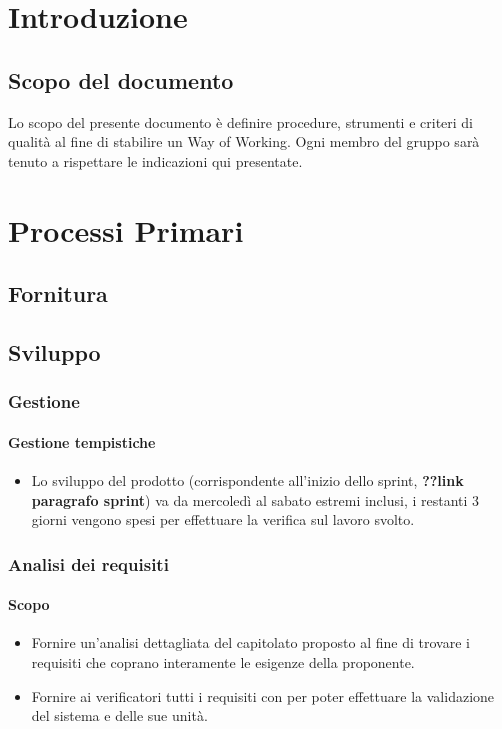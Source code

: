 \documentclass[a4paper, 12pt]{article}
\begin{document}
\makefrontpage

\makeversioni

\tableofcontents
\pagebreak

\section{Introduzione}
\subsection{Scopo del documento}
Lo scopo del presente documento è definire procedure, strumenti e criteri di qualità al fine di stabilire un Way of Working. Ogni membro del gruppo sarà tenuto a rispettare le indicazioni qui presentate.

\section{Processi Primari}
\subsection{Fornitura}\label{fornitura}

\subsection{Sviluppo}\label{processi-primari-sviluppo}
\subsubsection{Gestione}
\paragraph{Gestione tempistiche}
\begin{itemize}
	\item Lo sviluppo del prodotto (corrispondente all'inizio dello sprint, \textbf{??link paragrafo sprint})
	va da mercoledì al sabato estremi inclusi, i restanti 3 giorni vengono spesi per effettuare la verifica
	sul lavoro svolto. 
\end{itemize}
\subsubsection{Analisi dei requisiti}
\paragraph{Scopo}
\begin{itemize}
	\item Fornire un'analisi dettagliata del capitolato proposto al fine 
	di trovare i requisiti che coprano interamente le esigenze della proponente.
	\item Fornire ai verificatori tutti i requisiti con per poter effettuare la 
	validazione del sistema e delle sue unità.
\end{itemize}
\end{document}
